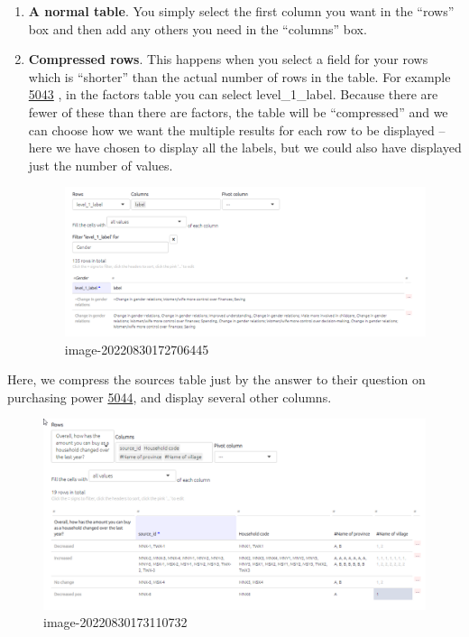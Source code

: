 \documentclass[
]{book}
\begin{document}
\begin{enumerate}
\def\labelenumi{\arabic{enumi}.}
\item
  \textbf{A normal table}. You simply select the first column you want in the ``rows'' box and then add any others you need in the ``columns'' box.
\item
  \textbf{Compressed rows}. This happens when you select a field for your rows which is ``shorter'' than the actual number of rows in the table. For example \href{https://causalmap.shinyapps.io/tokyo/?s=5043}{5043} , in the factors table you can select level\_1\_label. Because there are fewer of these than there are factors, the table will be ``compressed'' and we can choose how we want the multiple results for each row to be displayed -- here we have chosen to display all the labels, but we could also have displayed just the number of values.

  \begin{figure}
  \centering
  \includegraphics{_assets/image-20220830172706445.png}
  \caption{image-20220830172706445}
  \end{figure}
\end{enumerate}

Here, we compress the sources table just by the answer to their question on purchasing power \href{https://causalmap.shinyapps.io/tokyo/?s=5044}{5044}, and display several other columns.

\begin{figure}
\centering
\includegraphics{_assets/image-20220830173110732.png}
\caption{image-20220830173110732}
\end{figure}
\end{document}
